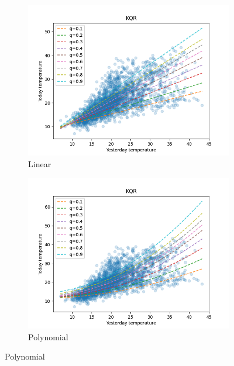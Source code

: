 \begin{figure}[!h]
\begin{subfigure}[b]{0.5\linewidth}
    \end{subfigure} 
    \begin{subfigure}[b]{0.5\linewidth}
        \centering
        \includegraphics[width=1.1\textwidth]{images/melborune_linear_kernel_quantile_regression.png}
        \caption{Linear} 
        \label{} 
        \vspace{4ex}
    \end{subfigure} 
    \begin{subfigure}[b]{0.5\linewidth}
        \centering
        \includegraphics[width=1.1\textwidth]{images/melborune_polynomial_kernel_quantile_regression.png}
        \caption{Polynomial} 
        \label{} 
        \vspace{4ex}
    \end{subfigure} 
    \end{figure}


